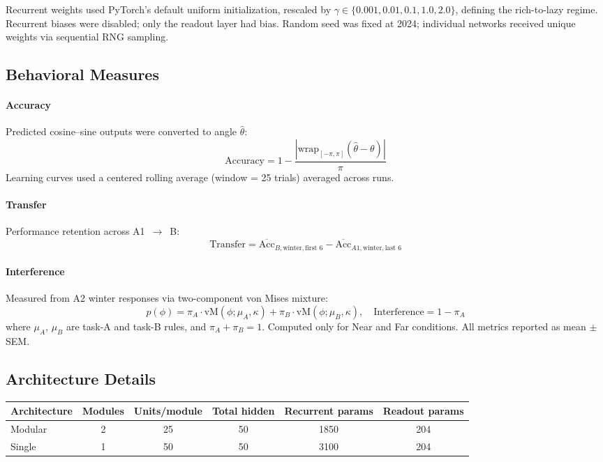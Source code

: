 Recurrent weights used PyTorch's default uniform initialization, rescaled by $\gamma \in \{0.001, 0.01, 0.1, 1.0, 2.0\}$, defining the rich-to-lazy regime. Recurrent biases were disabled; only the readout layer had bias. Random seed was fixed at 2024; individual networks received unique weights via sequential RNG sampling.

\subsection{Behavioral Measures}

\paragraph{Accuracy} Predicted cosine--sine outputs were converted to angle $\hat{\theta}$:
\[
\text{Accuracy} = 1 - \frac{\left|\mathrm{wrap}_{[-\pi,\pi]}(\hat{\theta}-\theta)\right|}{\pi}
\]
Learning curves used a centered rolling average (window = 25 trials) averaged across runs.

\paragraph{Transfer} Performance retention across A1~$\rightarrow$~B:
\[
\text{Transfer} = \overline{\text{Acc}}_{B,\text{winter},\text{first 6}} - \overline{\text{Acc}}_{A1,\text{winter},\text{last 6}}
\]

\paragraph{Interference} Measured from A2 winter responses via two-component von Mises mixture:
\[
p(\phi) = \pi_A \cdot \mathrm{vM}(\phi;\mu_A,\kappa) + \pi_B \cdot \mathrm{vM}(\phi;\mu_B,\kappa), \quad \text{Interference} = 1 - \pi_A
\]
where $\mu_A$, $\mu_B$ are task-A and task-B rules, and $\pi_A + \pi_B = 1$. Computed only for Near and Far conditions. All metrics reported as mean $\pm$ SEM.

\subsection{Architecture Details}

\begin{table}[h]
\centering
\small
\begin{tabular}{lccccc}
\toprule
Architecture & Modules & Units/module & Total hidden & Recurrent params & Readout params \\
\midrule
Modular & 2 & 25 & 50 & 1850 & 204 \\
Single & 1 & 50 & 50 & 3100 & 204 \\
\bottomrule
\end{tabular}
\end{table}

